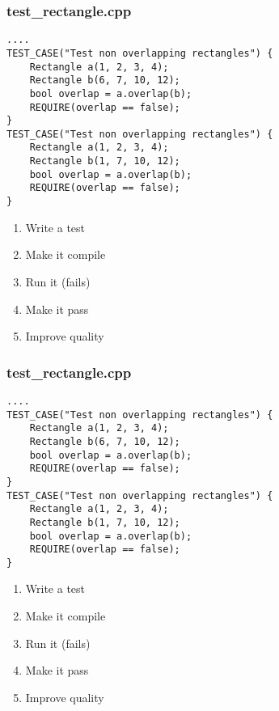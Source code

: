 \begin{frame}[fragile]
\frametitle{test\_rectangle.cpp}
\begin{minipage}[t]{0.48\linewidth}
\begin{lstlisting}
....
TEST_CASE("Test non overlapping rectangles") {
    Rectangle a(1, 2, 3, 4);
    Rectangle b(6, 7, 10, 12);
    bool overlap = a.overlap(b);
    REQUIRE(overlap == false);
}
TEST_CASE("Test non overlapping rectangles") {
    Rectangle a(1, 2, 3, 4);
    Rectangle b(1, 7, 10, 12);
    bool overlap = a.overlap(b);
    REQUIRE(overlap == false);
}
\end{lstlisting}
\end{minipage}\hfill
\begin{minipage}[t]{0.28\linewidth}
  \small
  \begin{enumerate} 
    \item \textcolor{activecolor}{Write a test}
    \item \textcolor{deadcolor}{Make it compile}
    \item \textcolor{deadcolor}{Run it (fails)}
    \item \textcolor{deadcolor}{Make it pass}
    \item \textcolor{deadcolor}{Improve quality}
  \end{enumerate} 
\end{minipage}
\end{frame}


\begin{frame}[fragile]
\frametitle{test\_rectangle.cpp}
\begin{minipage}[t]{0.48\linewidth}
\begin{lstlisting}
....
TEST_CASE("Test non overlapping rectangles") {
    Rectangle a(1, 2, 3, 4);
    Rectangle b(6, 7, 10, 12);
    bool overlap = a.overlap(b);
    REQUIRE(overlap == false);
}
TEST_CASE("Test non overlapping rectangles") {
    Rectangle a(1, 2, 3, 4);
    Rectangle b(1, 7, 10, 12);
    bool overlap = a.overlap(b);
    REQUIRE(overlap == false);
}
\end{lstlisting}
\end{minipage}\hfill
\begin{minipage}[t]{0.28\linewidth}
  \small
  \begin{enumerate} 
    \item \textcolor{deadcolor}{Write a test}
    \item \textcolor{activecolor}{Make it compile}
    \item \textcolor{deadcolor}{Run it (fails)}
    \item \textcolor{deadcolor}{Make it pass}
    \item \textcolor{deadcolor}{Improve quality}
  \end{enumerate} 
\end{minipage}
\end{frame}


